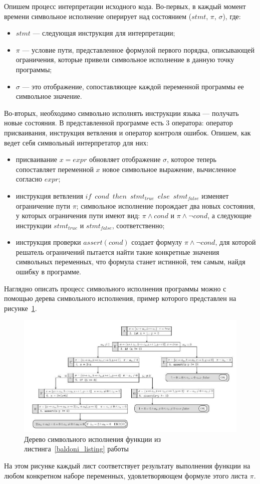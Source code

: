 Опишем процесс интерпретации исходного кода.
Во-первых, в каждый момент времени символьное исполнение оперирует над состоянием ($stmt$, $\pi$, $\sigma$), где:
\begin{itemize}
    \item $stmt$ --- следующая инструкция для интерпретации;
    \item $\pi$ --- условие пути, представленное формулой первого порядка, описывающей ограничения, которые привели символьное исполнение в данную точку программы;
    \item $\sigma$ --- это отображение, сопоставляющее каждой переменной программы ее символьное значение.
\end{itemize}
Во-вторых, необходимо символьно исполнять инструкции языка --- получать новые состояния. 
В представленной программе есть 3 оператора: оператор присваивания, инструкция ветвления и оператор контроля ошибок. 
Опишем, как ведет себя символьный интерпретатор для них:
\begin{itemize}
    \item присваивание $x = expr$ обновляет отображение $\sigma$, которое теперь сопоставляет переменной $x$ новое символьное выражение, вычисленное согласно $expr$;
    \item инструкция ветвления $if$~$cond$~$then$~$stmt_{true}$~$else$~$stmt_{false}$ изменяет ограничение пути $\pi$; символьное исполнение порождает два новых состояния, у которых ограничения пути имеют вид: $\pi \land cond$ и $\pi \land \neg cond$, а следующие инструкции $stmt_{true}$ и $stmt_{false}$, соответственно;
    \item инструкция проверки $assert(cond)$ создает формулу $\pi \land \neg cond$, для которой решатель ограничений пытается найти такие конкретные значения символьных переменных, что формула  станет истинной, тем самым, найдя ошибку в программе.
\end{itemize}

Наглядно описать процесс символьного исполнения программы можно с помощью дерева символьного исполнения, пример которого представлен на рисунке~\ref{exec-tree}.
\begin{figure}[H]
\centering
\includegraphics[scale=0.7,angle =270]{Batoev/images/sym_ex_tree.jpg}
\caption{Дерево символьного исполнения функции из листинга~\ref{baldoni_listing} работы~\cite{baldoni2018survey}}
\label{exec-tree}
\end{figure}
На этом рисунке каждый лист соответствует результату выполнения функции на любом конкретном наборе переменных, удовлетворяющем формуле этого листа $\pi$.

